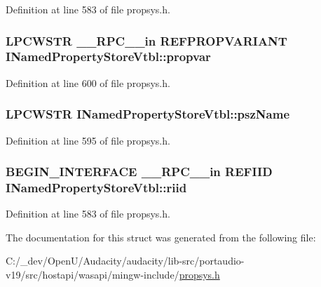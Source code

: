 Definition at line 583 of file propsys.\+h.

\subsubsection[{\texorpdfstring{propvar}{propvar}}]{ {\bf L\+P\+C\+W\+S\+TR} {\bf \+\_\+\+\_\+\+R\+P\+C\+\_\+\+\_\+in} {\bf R\+E\+F\+P\+R\+O\+P\+V\+A\+R\+I\+A\+NT} I\+Named\+Property\+Store\+Vtbl\+::propvar}\hypertarget{struct_i_named_property_store_vtbl_aa6a84e0137e3c7ae18419b03686c681f}{}\label{struct_i_named_property_store_vtbl_aa6a84e0137e3c7ae18419b03686c681f}


Definition at line 600 of file propsys.\+h.

\subsubsection[{\texorpdfstring{psz\+Name}{pszName}}]{ {\bf L\+P\+C\+W\+S\+TR} I\+Named\+Property\+Store\+Vtbl\+::psz\+Name}\hypertarget{struct_i_named_property_store_vtbl_a05c9fff903881ff0f397f7589b957348}{}\label{struct_i_named_property_store_vtbl_a05c9fff903881ff0f397f7589b957348}


Definition at line 595 of file propsys.\+h.

\subsubsection[{\texorpdfstring{riid}{riid}}]{\setlength{\rightskip}{0pt plus 5cm}B\+E\+G\+I\+N\+\_\+\+I\+N\+T\+E\+R\+F\+A\+CE {\bf \+\_\+\+\_\+\+R\+P\+C\+\_\+\+\_\+in} {\bf R\+E\+F\+I\+ID} I\+Named\+Property\+Store\+Vtbl\+::riid}\hypertarget{struct_i_named_property_store_vtbl_a2001956246d68e31b920e1d56a261675}{}\label{struct_i_named_property_store_vtbl_a2001956246d68e31b920e1d56a261675}


Definition at line 583 of file propsys.\+h.



The documentation for this struct was generated from the following file\+:\begin{DoxyCompactItemize}
\item 
C\+:/\+\_\+dev/\+Open\+U/\+Audacity/audacity/lib-\/src/portaudio-\/v19/src/hostapi/wasapi/mingw-\/include/\hyperlink{propsys_8h}{propsys.\+h}\end{DoxyCompactItemize}
